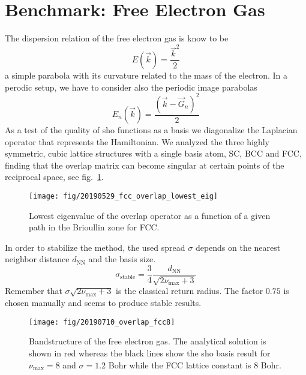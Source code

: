 \documentclass[oribibl]{llncs}
\newcommand{\um}[1]{_{\mathrm{#1}}}
\begin{document}
\section{Benchmark: Free Electron Gas}
The dispersion relation of the free electron gas is know to be
\begin{equation}
	E(\vec k)= \frac {\vec k^2} 2
\end{equation}
a simple parabola with its curvature related to the mass of the electron.
In a perodic setup, we have to consider also the periodic image parabolas
\begin{equation}
	E_n(\vec k) = \frac {(\vec k - \vec G_n)^2} 2
\end{equation}
As a test of the quality of \ac{sho} functions as a basis
we diagonalize the Laplacian operator that represents the
Hamiltonian.
We analyzed the three highly symmetric, cubic lattice structures with a single basis atom,
SC, BCC and FCC, finding that the overlap matrix can become singular at certain points of
the reciprocal space, see fig.~\ref{fig:overlap_lowest_eig}.
%
\begin{figure}
  \begin{minipage}[c]{.990\textwidth}
	\texttt{[image: fig/20190529\_fcc\_overlap\_lowest\_eig]} %
  \end{minipage}\hfill
  \begin{minipage}[c]{.009\textwidth}
  \end{minipage}
  \label{fig:overlap_lowest_eig}
  \caption{
	Lowest eigenvalue of the overlap operator as a function of a given path in the Brioullin zone for FCC.
  }
\end{figure}
%
%
In order to stabilize the method, the used spread $\sigma$ depends on the nearest neighbor distance $d\um{NN}$
and the basis size.
\begin{equation}
	\sigma\um{stable} = \frac34 \frac{ d\um{NN} }{ \sqrt{2 \nu\um{max} + 3} }
\end{equation}
Remember that $\sigma \sqrt{2 \nu\um{max} + 3}$ is the classical return radius.
The factor $0.75$ is chosen manually and seems to produce stable results.
%
\begin{figure}
  \begin{minipage}[c]{.990\textwidth}
	\texttt{[image: fig/20190710\_overlap\_fcc8]} %
  \end{minipage}\hfill
  \begin{minipage}[c]{.009\textwidth}
  \end{minipage}
  \label{fig:overlap_fcc8}
  \caption{
	Bandstructure of the free electron gas. The analytical solution is shown in red
	whereas the black lines show the \ac{sho} basis result for $\nu\um{max} = 8$ and $\sigma = 1.2$ Bohr 
	while the FCC lattice constant is $8$ Bohr.
  }
\end{figure}
\end{document}
